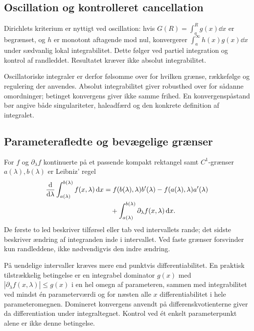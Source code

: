 

\subsection{Oscillation og kontrolleret cancellation}
Dirichlets kriterium er nyttigt ved oscillation: hvis
$G(R)=\int_a^R g(x)\dd x$ er begrænset, og $h$ er monotont aftagende
mod nul, konvergerer $\int_a^\infty h(x)g(x)\dd x$ under sædvanlig
lokal integrabilitet. Dette følger ved partiel integration og kontrol
af randleddet. Resultatet kræver ikke absolut integrabilitet.

Oscillatoriske integraler er derfor følsomme over for hvilken grænse,
rækkefølge og regulering der anvendes. Absolut integrabilitet giver
robusthed over for sådanne omordninger; betinget konvergens giver ikke
samme frihed. En konvergenspåstand bør angive både singulariteter,
haleadfærd og den konkrete definition af integralet.

\subsection{Parameterafledte og bevægelige grænser}
For $f$ og $\partial_\lambda f$ kontinuerte på et passende kompakt
rektangel samt $C^1$-grænser $a(\lambda),b(\lambda)$ er Leibniz' regel
\begin{align}
 \frac{\mathop{}\!\mathrm{d}}{\mathop{}\!\mathrm{d}\lambda}\int_{a(\lambda)}^{b(\lambda)}f(x,\lambda)\mathop{}\!\mathrm{d} x
 &=f(b(\lambda),\lambda)b'(\lambda)
   -f(a(\lambda),\lambda)a'(\lambda)\notag\\
 &\quad+\int_{a(\lambda)}^{b(\lambda)}
                 \partial_\lambda f(x,\lambda)\mathop{}\!\mathrm{d} x.
 \label{eq:leibniz-integral}
\end{align}
De første to led beskriver tilførsel eller tab ved intervallets rande;
det sidste beskriver ændring af integranden inde i intervallet. Ved faste
grænser forsvinder kun randleddene, ikke nødvendigvis den indre ændring.

På uendelige intervaller kræves mere end punktvis differentiabilitet.
En praktisk tilstrækkelig betingelse er en integrabel dominator
$g(x)$ med $|\partial_\lambda f(x,\lambda)|\le g(x)$ i en hel omegn af
parameteren, sammen med integrabilitet ved mindst én parameterværdi og
for næsten alle $x$ differentiabilitet i hele parameteromegnen. Domineret konvergens anvendt
på differenskvotienterne giver da differentiation under integraltegnet.
Kontrol ved ét enkelt parameterpunkt alene er ikke denne betingelse.

